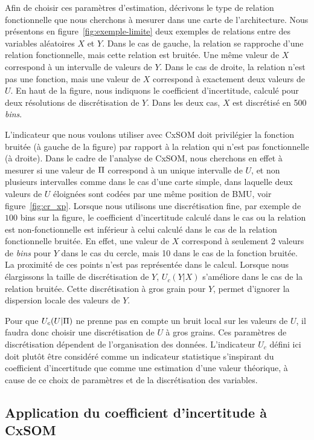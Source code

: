 \documentclass[../main]{subfiles}
\begin{document}
Afin de choisir ces paramètres d'estimation, décrivons le type de relation fonctionnelle que nous cherchons à mesurer dans une carte de l'architecture.
Nous présentons en figure~\ref{fig:exemple-limite} deux exemples de relations entre des variables aléatoires $X$ et $Y$. Dans le cas de gauche, la relation se rapproche d'une relation fonctionnelle, mais cette relation est bruitée. Une même valeur de $X$ correspond à un intervalle de valeurs de $Y$. Dans le cas de droite, la relation n'est pas une fonction, mais une valeur de $X$ correspond à exactement deux valeurs de $U$. En haut de la figure, nous indiquons le coefficient d'incertitude, calculé pour deux résolutions de discrétisation de $Y$. Dans les deux cas, $X$ est discrétisé en 500 \emph{bins}.


L'indicateur que nous voulons utiliser avec CxSOM doit privilégier la fonction bruitée (à gauche de la figure) par rapport à la relation qui n'est pas fonctionnelle (à droite).
Dans le cadre de l'analyse de CxSOM, nous cherchons en effet à mesurer si une valeur de $\Pi$ correspond à un unique intervalle de $U$, et non plusieurs intervalles comme dans le cas d'une carte simple, dans laquelle deux valeurs de $U$ éloignées sont codées par une même position de BMU, voir figure~\ref{fig:cr_xp}.
Lorsque nous utilisons une discrétisation fine, par exemple de $100$ bins sur la figure, le coefficient d'incertitude calculé dans le cas ou la relation est non-fonctionnelle est inférieur à celui calculé dans le cas de la relation fonctionnelle bruitée.
En effet, une valeur de $X$ correspond à seulement 2 valeurs de \emph{bins} pour $Y$ dans le cas du cercle, mais 10 dans le cas de la fonction bruitée. La proximité de ces points n'est pas représentée dans le calcul.
Lorsque nous élargissons la taille de discrétisation de $Y$, $U_c(Y|X)$ s'améliore dans le cas de la relation bruitée. Cette discrétisation à gros grain pour $Y$, permet d'ignorer la dispersion locale des valeurs de $Y$.

Pour que $U_c(U|\Pi)$ ne prenne pas en compte un bruit local sur les valeurs de $U$, il faudra donc choisir une discrétisation de $U$ à gros grains. Ces paramètres de discrétisation dépendent de l'organisation des données.
L'indicateur $U_c$ défini ici doit plutôt être considéré comme un indicateur statistique s'inspirant du coefficient d'incertitude que comme une estimation d'une valeur théorique, à cause de ce choix de paramètres et de la discrétisation des variables.

\subsection{Application du coefficient d'incertitude à CxSOM}
\end{document}
